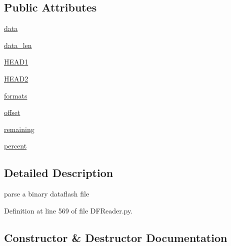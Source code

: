 \subsection*{Public Attributes}
\begin{DoxyCompactItemize}
\item 
\mbox{\hyperlink{classpymavlink_1_1DFReader_1_1DFReader__binary_a3b816525d2d54907d8f30b9fb8b5df30}{data}}
\item 
\mbox{\hyperlink{classpymavlink_1_1DFReader_1_1DFReader__binary_a0ab35107f2964c2bf3c132f03f4b0c34}{data\+\_\+len}}
\item 
\mbox{\hyperlink{classpymavlink_1_1DFReader_1_1DFReader__binary_ac47fb932eda0850aa88561052d44c055}{H\+E\+A\+D1}}
\item 
\mbox{\hyperlink{classpymavlink_1_1DFReader_1_1DFReader__binary_a1fec06041f6333071877720afd96e8df}{H\+E\+A\+D2}}
\item 
\mbox{\hyperlink{classpymavlink_1_1DFReader_1_1DFReader__binary_a69e3977c6dbba7ea747b620541b272ee}{formats}}
\item 
\mbox{\hyperlink{classpymavlink_1_1DFReader_1_1DFReader__binary_abc21a7c5ba35c138513bdbe1701d2425}{offset}}
\item 
\mbox{\hyperlink{classpymavlink_1_1DFReader_1_1DFReader__binary_a24e3115c0432ba83b22d4dba1ab46f29}{remaining}}
\item 
\mbox{\hyperlink{classpymavlink_1_1DFReader_1_1DFReader__binary_a14b6477bdb0c30fad0dcc75099a87d4b}{percent}}
\end{DoxyCompactItemize}


\subsection{Detailed Description}
\begin{DoxyVerb}parse a binary dataflash file\end{DoxyVerb}
 

Definition at line 569 of file D\+F\+Reader.\+py.



\subsection{Constructor \& Destructor Documentation}
\mbox{\label{classpymavlink_1_1DFReader_1_1DFReader__binary_ac46a1c2d0b542bf8a571362f5d91840d}} 
